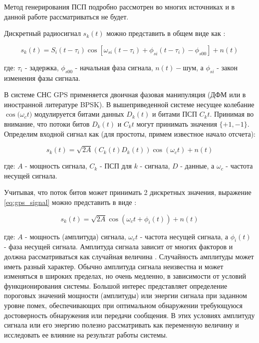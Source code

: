 Метод генерирования ПСП подробно рассмотрен во многих источниках \cite{tsui, akos-book, kaplan}
и в данной работе рассматриваться не будет.

Дискретный радиосигнал $s_k(t)$ можно представить в общем виде как \cite{pestryakov-book}:
\begin{center}
\begin{equation}
	\label{eq:model_signal}
	s_k(t) = S_i(t - \tau_{i})\cos[\omega_{si}(t - \tau_{i}) + \phi_{si}(t - \tau_{i}) - \phi_{s00}] + n(t)
\end{equation}
\end{center}
где: ${\tau_i}$ - задержка, ${\phi_{s00}}$ - начальная фаза сигнала, ${n(t)} - шум$,
а ${\phi_{si}}$ - закон изменения фазы сигнала.

В системе СНС GPS применяется двоичная фазовая манипуляция (ДФМ или в иностранной литературе BPSK).
В вышеприведенной системе несущее колебание ${\cos(\omega_{c}t})$ модулируется битами данных ${D_k(t)}$ и битами ПСП
${C_k{t}}$. Принимая во внимание, что потоки битов ${D_k(t)}$ и ${C_k{t}}$ могут принимать значения
${\{+1, -1\}}$. Определим входной сигнал как (для простоты, примем известное начало отсчета):

\begin{center}
\begin{equation}
	\label{eq:gps_signal}
	s_k(t) = \sqrt{2A}(C_k(t)D_k(t))\cos(\omega_{c}t) + n(t)
\end{equation}
\end{center}
где: ${A}$ - мощность сигнала, ${C_k}$ - ПСП для ${k}$ - сигнала, ${D}$ - данные, а ${\omega_{c}}$ - частота несущей сигнала.

Учитывая, что поток битов может принимать 2 дискретных значения, выражение \ref{eq:gps_signal} можно представить в виде \cite{sklyar}:
\begin{center}
\begin{equation}
	\label{eq:gps_signal_phase}
	s_k(t) = \sqrt{2A}\cos(\omega_{c}t + \phi_{i}(t)) + n(t)
\end{equation}
\end{center}
где: ${A}$ - мощность (амплитуда) сигнала, ${\omega_{c}t}$ - частота несущей сигнала, а ${\phi_{i}(t)}$ - фаза несущей сигнала.
Амплитуда сигнала зависит от многих факторов и должна рассматриваться как случайная величина \cite{pestryakov-book}. Случайность
амплитуды может иметь разный характер. Обычно амплитуда сигнала неизвестна и может изменяться в широких пределах,
но очень медленно, в зависимости от условий функционирования системы. Большой интерес представляет определение пороговых
значений мощности (амплитуды) или энергии сигнала при заданном уровне помех, обеспечивающих при оптимальном
обнаружении требующуюся достоверность обнаружения или передачи сообщения. В этих условиях амплитуду сигнала или его энергию
полезно рассматривать как переменную величину и исследовать ее влияние на результат работы системы.

